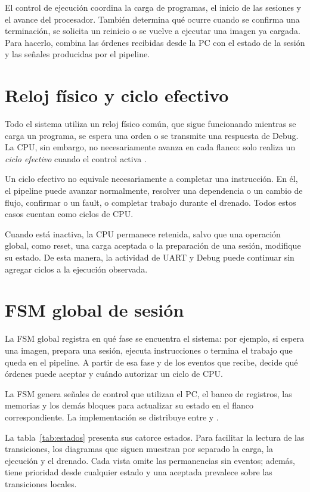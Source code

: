 El control de ejecución coordina la carga de programas, el inicio de las
sesiones y el avance del procesador. También determina qué ocurre cuando se
confirma una terminación, se solicita un reinicio o se vuelve a ejecutar una
imagen ya cargada. Para hacerlo, combina las órdenes recibidas desde la PC con
el estado de la sesión y las señales producidas por el pipeline.

\section{Reloj físico y ciclo efectivo}

Todo el sistema utiliza un reloj físico común, que sigue funcionando mientras
se carga un programa, se espera una orden o se transmite una respuesta de
Debug. La CPU, sin embargo, no necesariamente avanza en cada flanco: solo
realiza un \emph{ciclo efectivo} cuando el control activa
.

Un ciclo efectivo no equivale necesariamente a completar una instrucción. En
él, el pipeline puede avanzar normalmente, resolver una dependencia o un cambio
de flujo, confirmar  o un fault, o completar trabajo durante el
drenado. Todos estos casos cuentan como ciclos de CPU.

Cuando  está inactiva, la CPU permanece retenida, salvo
que una operación global, como reset, una carga aceptada o la preparación de
una sesión, modifique su estado. De esta manera, la actividad de UART y Debug
puede continuar sin agregar ciclos a la ejecución observada.

\section{FSM global de sesión}

La FSM global registra en qué fase se encuentra el sistema: por ejemplo, si
espera una imagen, prepara una sesión, ejecuta instrucciones o termina el
trabajo que queda en el pipeline. A partir de esa fase y de los eventos que
recibe, decide qué órdenes puede aceptar y cuándo autorizar un ciclo de CPU.

La FSM genera señales de control que utilizan el PC, el banco de registros,
las memorias y los demás bloques para actualizar su estado en el flanco
correspondiente. La implementación se distribuye entre  y
.

La tabla~\ref{tab:estados} presenta sus catorce estados. Para facilitar la
lectura de las transiciones, los diagramas que siguen muestran por separado la
carga, la ejecución y el drenado. Cada vista omite las permanencias sin eventos;
además,  tiene prioridad desde cualquier estado y una 
aceptada prevalece sobre las transiciones locales.

